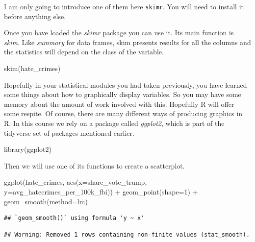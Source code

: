 \documentclass[
]{book}
\newenvironment{Shaded}{\begin{snugshade}}{\end{snugshade}}
\newcommand{\AttributeTok}[1]{\textcolor[rgb]{0.77,0.63,0.00}{#1}}
\newcommand{\DecValTok}[1]{\textcolor[rgb]{0.00,0.00,0.81}{#1}}
\newcommand{\FunctionTok}[1]{\textcolor[rgb]{0.00,0.00,0.00}{#1}}
\newcommand{\NormalTok}[1]{#1}
\newcommand{\SpecialCharTok}[1]{\textcolor[rgb]{0.00,0.00,0.00}{#1}}
\begin{document}
I am only going to introduce one of them here \texttt{skimr}. You will need to install it before anything else.

Once you have loaded the \emph{skimr} package you can use it. Its main function is \emph{skim}. Like \emph{summary} for data frames, skim presents results for all the columns and the statistics will depend on the class of the variable.

\begin{Shaded}
\begin{Highlighting}[]
\FunctionTok{skim}\NormalTok{(hate\_crimes)}
\end{Highlighting}
\end{Shaded}

Hopefully in your statistical modules you had taken previously, you have learned some things about how to graphically display variables. So you may have some memory about the amount of work involved with this. Hopefully R will offer some respite. Of course, there are many different ways of producing graphics in R. In this course we rely on a package called \emph{ggplot2}, which is part of the tidyverse set of packages mentioned earlier.

\begin{Shaded}
\begin{Highlighting}[]
\FunctionTok{library}\NormalTok{(ggplot2)}
\end{Highlighting}
\end{Shaded}

Then we will use one of its functions to create a scatterplot.

\begin{Shaded}
\begin{Highlighting}[]
\FunctionTok{ggplot}\NormalTok{(hate\_crimes, }\FunctionTok{aes}\NormalTok{(}\AttributeTok{x=}\NormalTok{share\_vote\_trump, }\AttributeTok{y=}\NormalTok{avg\_hatecrimes\_per\_100k\_fbi)) }\SpecialCharTok{+}
    \FunctionTok{geom\_point}\NormalTok{(}\AttributeTok{shape=}\DecValTok{1}\NormalTok{) }\SpecialCharTok{+}
     \FunctionTok{geom\_smooth}\NormalTok{(}\AttributeTok{method=}\NormalTok{lm)}
\end{Highlighting}
\end{Shaded}

\begin{verbatim}
## `geom_smooth()` using formula 'y ~ x'
\end{verbatim}

\begin{verbatim}
## Warning: Removed 1 rows containing non-finite values (stat_smooth).
\end{verbatim}
\end{document}
